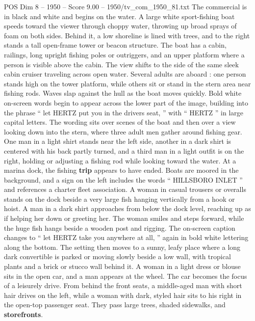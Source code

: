 \begin{textsample}{POS Dim 8 – 1950 – Score 9.00 – 1950/tv\_com\_1950\_81.txt}  \label{ex:f8_pos_071}
The commercial is in black and white and begins on the water.
A large white sport-fishing boat speeds toward the viewer through choppy water, throwing up broad sprays of foam on both sides.
Behind it, a low shoreline is lined with trees, and to the right stands a tall open-frame tower or beacon structure.
The boat has a cabin, railings, long upright fishing poles or outriggers, and an upper platform where a person is visible above the cabin.
The view shifts to the side of the same sleek cabin cruiser traveling across open water.
Several adults are aboard : one person stands high on the tower platform, while others sit or stand in the stern area near fishing rods.
Waves slap against the hull as the boat moves quickly.
Bold white on-screen words begin to appear across the lower part of the image, building into the phrase “ let HERTZ put you in the drivers seat, ” with “ HERTZ ” in large capital letters.
The wording sits over scenes of the boat and then over a view looking down into the stern, where three adult men gather around fishing gear.
One man in a light shirt stands near the left side, another in a dark shirt is centered with his back partly turned, and a third man in a light outfit is on the right, holding or adjusting a fishing rod while looking toward the water.
At a marina dock, the fishing \textbf{trip} appears to have ended.
Boats are moored in the background, and a sign on the left includes the words “ HILLSBORO INLET ” and references a charter fleet association.
A woman in casual trousers or overalls stands on the dock beside a very large fish hanging vertically from a hook or hoist.
A man in a dark shirt approaches from below the dock level, reaching up as if helping her down or greeting her.
The woman smiles and steps forward, while the huge fish hangs beside a wooden post and rigging.
The on-screen caption changes to “ let HERTZ take you anywhere at all, ” again in bold white lettering along the bottom.
The setting then moves to a sunny, leafy place where a long dark convertible is parked or moving slowly beside a low wall, with tropical plants and a brick or stucco wall behind it.
A woman in a light dress or blouse sits in the open car, and a man appears at the wheel.
The car becomes the focus of a leisurely drive.
From behind the front seats, a middle-aged man with short hair drives on the left, while a woman with dark, styled hair sits to his right in the open-top passenger seat.
They pass large trees, shaded sidewalks, and \textbf{storefronts}.

\end{textsample}
